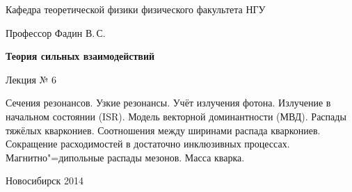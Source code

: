 \documentclass[12pt,pagesize,paper=192mm:108mm]{scrbook}
\begin{document}
\begin{titlepage}
\begin{center}
    Кафедра теоретической физики физического факультета НГУ
    \medskip

    \Large
    Профессор Фадин В.\,С.

    \huge
    \textbf{Теория сильных взаимодействий}
    \smallskip
    
    \Large
    Лекция № 6
    \vfill
    
    \normalsize
    \begin{minipage}{0.7\linewidth}
      Сечения резонансов. Узкие резонансы. Учёт излучения
      фотона. Излучение в начальном состоянии (ISR). Модель векторной
      доминантности (МВД). Распады тяжёлых кваркониев. Соотношения
      между ширинами распада кваркониев. Сокращение расходимостей в
      достаточно инклюзивных процессах. Магнитно"=дипольные распады
      мезонов. Масса кварка.
    \end{minipage}
    \vfill
    
    \normalsize \ccbysa\hspace{0.5em}  Новосибирск 2014   
  \end{center}
\end{titlepage}
\end{document}
